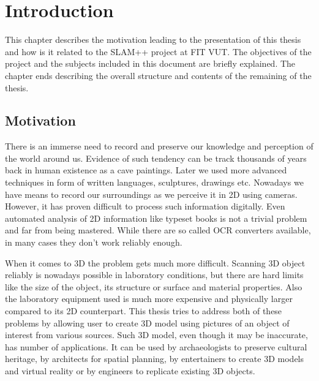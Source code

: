 
\chapter{Introduction}
This chapter describes the motivation leading to the presentation of this thesis and how is it related to the SLAM++ project at FIT VUT. The objectives of the project and the subjects included in this document are briefly explained. The chapter ends describing the overall structure and contents of the remaining of the thesis.

\section{Motivation}
There is an immerse need to record and preserve our knowledge and perception of the world around us. Evidence of such tendency can be track thousands of years back in human existence as a cave paintings. Later we used more advanced techniques in form of written languages, sculptures, drawings etc. Nowadays we have means to record our surroundings as we perceive it in 2D using cameras. However, it has proven difficult to process such information digitally. Even automated analysis of 2D information like typeset books is not a trivial problem and far from being mastered. While there are so called OCR converters available, in many cases they don't work reliably enough.

When it comes to 3D the problem gets much more difficult. Scanning 3D object reliably is nowadays possible in laboratory conditions, but there are hard limits like the size of the object, its structure or surface and material properties. Also the laboratory equipment used is much more expensive and physically larger compared to its 2D counterpart. This thesis tries to address both of these problems by allowing user to create 3D model using pictures of an object of interest from various sources. Such 3D model, even though it may be inaccurate, has number of applications. It can be used by archaeologists to preserve cultural heritage, by architects for spatial planning, by entertainers to create 3D models and virtual reality or by engineers to replicate existing 3D objects.

